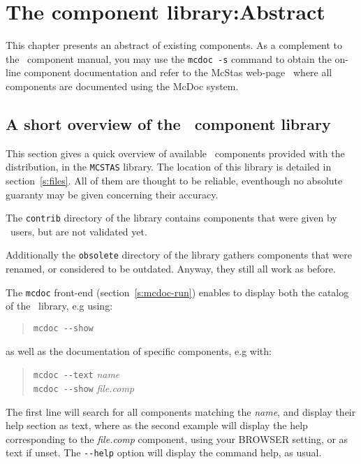 
\chapter{The component library:Abstract}
\label{s:components}

This chapter presents an abstract of existing components. As a complement to the \MCS\ component manual, you may use the \verb+mcdoc -s+ command to obtain the on-line component documentation and refer to the McStas web-page~\cite{mcstas_webpage} where all components are documented using the McDoc system.

\section{A short overview of the \MCS\ component library}
\label{s:comp-overview}

This section gives a quick overview of available \MCS\ components
provided with the distribution, in the \verb+MCSTAS+ library. The
location of this library is detailed in section~\ref{s:files}. All of them are thought to be reliable, eventhough no absolute guaranty may be given concerning their accuracy.

The \verb+contrib+ directory of the library contains components that were given by \MCS\ users, but are not validated yet. 

Additionally the \verb+obsolete+ directory of the library gathers components that were renamed, or considered to be outdated. Anyway, they still all work as before.

The \verb+mcdoc+ front-end (section~\ref{s:mcdoc-run}) enables to display both the
catalog of the \MCS\ library, e.g using: 
\begin{quote}
  \verb|mcdoc --show|
\end{quote}
as well as the documentation of specific components, e.g with:
\begin{quote}
  \verb|mcdoc --text| {\it name} \\
  \verb|mcdoc --show| {\it file.comp}
\end{quote}
The first line will search for all components matching the {\it name}, and display their help section as text, where as the second example will display the help corresponding to the {\it file.comp} component, using your BROWSER setting, or as text if unset. The \verb+--help+ option will display the command help, as usual.

